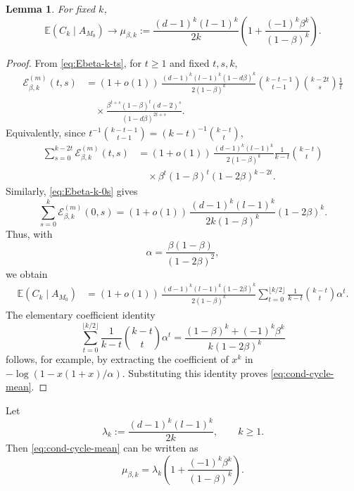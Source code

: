 \documentclass[11pt]{amsart}
\theoremstyle{plain}
\newtheorem{lemma}[theorem]{Lemma}
\numberwithin{equation}{section}
\numberwithin{theorem}{section}
\numberwithin{figure}{section}
\begin{document}
\begin{lemma}\label{l30}
For fixed \(k\),
\begin{equation}\label{eq:cond-cycle-mean}
  \mathbb E(C_k\mid A_{M_0})
  \longrightarrow
  \mu_{\beta,k}
  :=\frac{(d-1)^k(l-1)^k}{2k}
    \left(1+\frac{(-1)^k\beta^k}{(1-\beta)^k}\right).
\end{equation}
\end{lemma}

\begin{proof}
From \eqref{eq:Ebeta-k-ts}, for \(t\ge1\) and fixed \(t,s,k\),
\begin{align*}
\mathcal E^{(m)}_{\beta,k}(t,s)
&=(1+o(1))\,
\frac{(d-1)^k(l-1)^k(1-d\beta)^k}{2(1-\beta)^k}
\binom{k-t-1}{t-1}\binom{k-2t}{s}\frac1t \\
&\quad\times
\frac{\beta^{t+s}(1-\beta)^t(d-2)^s}{(1-d\beta)^{2t+s}}.
\end{align*}
Equivalently, since
\(t^{-1}\binom{k-t-1}{t-1}=(k-t)^{-1}\binom{k-t}{t}\),
\begin{align*}
\sum_{s=0}^{k-2t}\mathcal E^{(m)}_{\beta,k}(t,s)
&=(1+o(1))\,
\frac{(d-1)^k(l-1)^k}{2(1-\beta)^k}
\frac1{k-t}\binom{k-t}{t} \\
&\quad\times
\beta^t(1-\beta)^t(1-2\beta)^{k-2t}.
\end{align*}
Similarly, \eqref{eq:Ebeta-k-0s} gives
\[
  \sum_{s=0}^{k}\mathcal E^{(m)}_{\beta,k}(0,s)
  =(1+o(1))\,
  \frac{(d-1)^k(l-1)^k}{2k(1-\beta)^k}(1-2\beta)^k .
\]
Thus, with
\[
  \alpha=\frac{\beta(1-\beta)}{(1-2\beta)^2},
\]
we obtain
\begin{align*}
\mathbb E(C_k\mid A_{M_0})
&=(1+o(1))\,
\frac{(d-1)^k(l-1)^k(1-2\beta)^k}{2(1-\beta)^k}
\sum_{t=0}^{\lfloor k/2\rfloor}
  \frac1{k-t}\binom{k-t}{t}\alpha^t .
\end{align*}
The elementary coefficient identity
\[
\sum_{t=0}^{\lfloor k/2\rfloor}\frac1{k-t}\binom{k-t}{t}\alpha^t
 =\frac{(1-\beta)^k+(-1)^k\beta^k}{k(1-2\beta)^k}
\]
follows, for example, by extracting the coefficient of \(x^k\) in
\(-\log(1-x(1+x)/\alpha)\).  Substituting this identity proves
\eqref{eq:cond-cycle-mean}.
\end{proof}

Let
\begin{equation}\label{elk}
  \lambda_k:=\frac{(d-1)^k(l-1)^k}{2k},\qquad k\ge1.
\end{equation}
Then \eqref{eq:cond-cycle-mean} can be written as
\begin{equation}\label{ecc}
  \mu_{\beta,k}=\lambda_k\left(1+\frac{(-1)^k\beta^k}{(1-\beta)^k}\right).
\end{equation}
\end{document}
